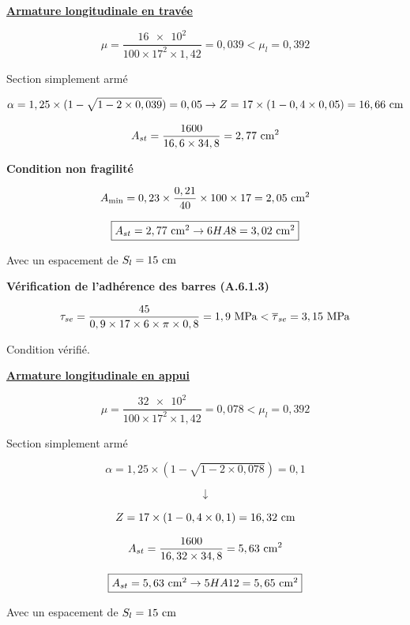 \textbf{\underline{Armature longitudinale en travée}}

\[ \mu = \dfrac{\num{16e2}}{100 \times 17^{2} \times 1,42} = 0,039 < \mu_{l} =
0,392 \]
{\centering Section simplement armé\par}

\[ \alpha = 1,25 \times (1 - \sqrt{1 - 2 \times 0,039}) = 0,05 \rightarrow Z =
17 \times (1 - 0,4 \times 0,05) = 16,66\cml \]

\[ A_{st} = \dfrac{1600}{16,6 \times 34,8} = 2,77\cmsq \]




\textbf{Condition non fragilité}

\[ A_{\min} = 0,23 \times \dfrac{0,21}{40} \times 100 \times 17 = 2,05\cmsq \]

\[ \fbox{$A_{st} = 2,77\cmsq \rightarrow 6HA8 = 3,02\cmsq$} \]


{\centering Avec un espacement de $S_{l} = 15\cml$\par}

\vspace{\baselineskip}



\textbf{Vérification de l'adhérence des barres (A.6.1.3)}

\[ \tau_{se} = \dfrac{45}{0,9 \times 17 \times 6 \times \pi \times 0,8 } =
1,9\mpa < \taubar{se} = 3,15\mpa \]

{\centering Condition vérifié.\par}

\vspace{5\baselineskip}

\textbf{\underline{Armature longitudinale en appui}}

\[ \mu = \dfrac{\num{32e2}}{100 \times 17^{2} \times 1,42} = 0,078 < \mu_{l} =
0,392 \]
{\centering Section simplement armé\par}

\[ \alpha = 1,25 \times (1 - \sqrt{1 - 2 \times 0,078}) = 0,1\]

\[ \downarrow \]

\[ Z = 17 \times (1 - 0,4 \times 0,1) = 16,32\cml  \]

\[ A_{st} = \dfrac{1600}{16,32 \times 34,8} = 5,63\cmsq \]




\[ \fbox{$A_{st} = 5,63\cmsq \rightarrow 5HA12 = 5,65\cmsq$} \]


{\centering Avec un espacement de $S_{l} = 15\cml$\par}


